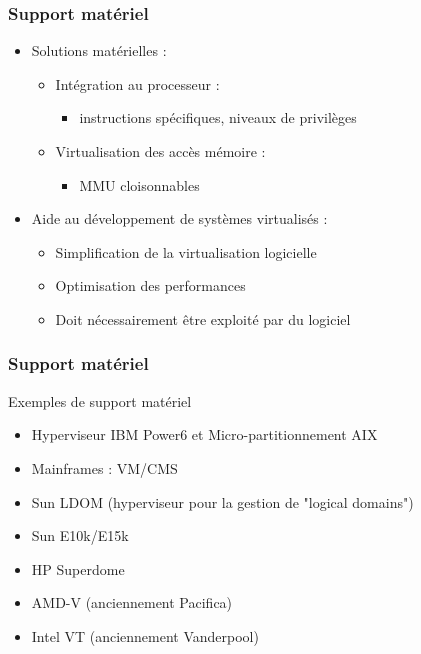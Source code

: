 \begin{frame}
\frametitle{Support matériel}
\begin{itemize}
\item <1> Solutions matérielles :
\begin{itemize}
\item Intégration au processeur : 
\begin{itemize}
\item instructions spécifiques, niveaux de privilèges

\end{itemize}
\item Virtualisation des accès mémoire :
\begin{itemize}
\item MMU cloisonnables

\end{itemize}
\end{itemize}

\item <2> Aide au développement de systèmes virtualisés :
\begin{itemize}
\item Simplification de la virtualisation logicielle
\item Optimisation des performances
\item Doit nécessairement être exploité par du logiciel
\end{itemize}


\end{itemize}


\end{frame}

\begin{frame}
\frametitle{Support matériel}
\begin{exampleblock}{Exemples de support matériel}
\begin{itemize}
\item Hyperviseur IBM Power6 et Micro-partitionnement AIX
\item Mainframes : VM/CMS
\item Sun LDOM (hyperviseur pour la gestion de "logical domains")
\item Sun E10k/E15k
\item HP Superdome
\item AMD-V (anciennement Pacifica)
\item Intel VT (anciennement Vanderpool)
\end{itemize}
\end{exampleblock}
\end{frame}

